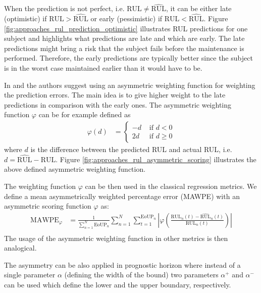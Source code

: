 When the prediction is not perfect, i.e. $\text{RUL} \neq \widehat{\text{RUL}}$, it can be either late (optimistic) if $\text{RUL} > \widehat{\text{RUL}}$ or early (pessimistic) if $\text{RUL} < \widehat{\text{RUL}}$.
Figure \ref{fig:approaches_rul_prediction_optimistic} illustrates RUL predictions for one subject and highlights what predictions are late and which are early.
The late predictions might bring a risk that the subject fails before the maintenance is performed.
Therefore, the early predictions are typically better since the subject is in the worst case maintained earlier than it would have to be.

In \cite{nectoux2012pronostia} and \cite{saxena2008damage} the authors suggest using an asymmetric weighting function for weighting the prediction errors.
The main idea is to give higher weight to the late predictions in comparison with the early ones.
The asymmetric weighting function $\varphi$ can be for example defined as
\begin{align*}
    \varphi(d) &= \begin{cases}
            -d &\text{ if } d < 0\\
            2d &\text{ if } d \geq 0
    \end{cases}
\end{align*}
where $d$ is the difference between the predicted RUL and actual RUL, i.e. $d = \widehat{\text{RUL}} - \text{RUL}$.
Figure \ref{fig:approaches_rul_asymmetric_scoring} illustrates the above defined asymmetric weighting function.

The weighting function $\varphi$ can be then used in the classical regression metrics.
We define a mean asymmetrically weighted percentage error (MAWPE) with an asymmetric scoring function $\varphi$ as:
\begin{align*}
    \text{MAWPE}_\varphi &= \frac{1}{\sum_{n=1}^N{{\text{EoUP}_n}}}\sum_{n=1}^{N}{\sum_{t=1}^{\text{EoUP}_n}\left|\varphi\left(\frac{\text{RUL}_n(t) - \widehat{\text{RUL}}_n(t)}{\text{RUL}_n(t)}\right)\right|} \\
\end{align*}
The usage of the asymmetric weighting function in other metrics is then analogical.

The asymmetry can be also applied in prognostic horizon where instead of a single parameter $\alpha$ (defining the width of the bound) two parameters $\alpha^+$ and $\alpha^-$ can be used which define the lower and the upper boundary, respectively.